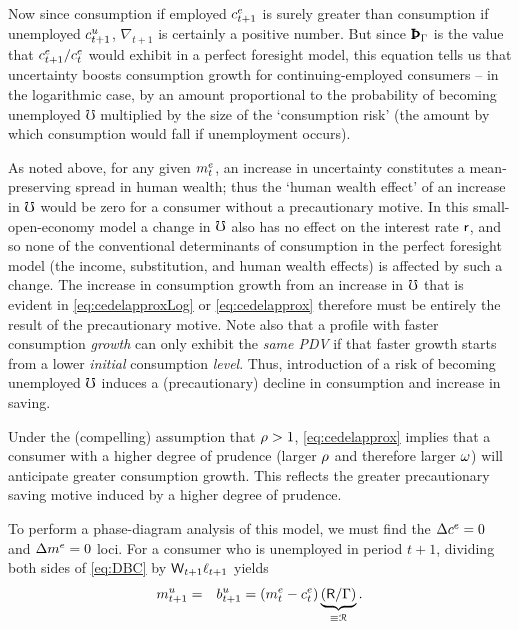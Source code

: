 \documentclass{handout}
\begin{document}
Now since consumption if employed $c^{e}_{t+1}$ is surely greater than
consumption if unemployed $c^{u}_{t+1}$, $\nabla _{t+1}$ is
certainly a positive number.  But since ${\PatPGro}$ is the
value that $c^{e}_{t+1}/c^{e}_{t}$ would exhibit in a perfect
foresight model, this equation tells us that uncertainty boosts
consumption growth for continuing-employed consumers -- in the logarithmic
case, by an amount
proportional to the probability of becoming unemployed $\mho$ multiplied
by the size of the `consumption risk' (the amount by which consumption
would fall if unemployment occurs).


As noted above, for any given $m^{e}_{t}$, an increase in uncertainty
constitutes a mean-preserving spread in human wealth; thus the `human
wealth effect' of an increase in $\mho$ would be zero for a consumer
without a precautionary motive.  In this small-open-economy model a
change in $\mho$ also has no effect on the interest rate $\mathsf{r}$,
and so none of the conventional determinants of consumption in the
perfect foresight model (the income, substitution, and human wealth
effects) is affected by such a change.  The increase in consumption
growth from an increase in $\mho$ that is evident in
\eqref{eq:cedelapproxLog} or \eqref{eq:cedelapprox} therefore must be
entirely the result of the precautionary motive.  Note also that
a profile with faster consumption {\it growth} can only exhibit the {\it same PDV} if that faster growth 
starts from a lower {\it initial} consumption {\it level}.  Thus, introduction of a risk
of becoming unemployed $\mho$ induces a (precautionary) decline in consumption and increase in
saving.

Under the (compelling) assumption that $\rho > 1$, \eqref{eq:cedelapprox} implies that a consumer with
a higher degree of prudence (larger $\rho$ and therefore larger $\omega$) will
anticipate greater consumption growth.  This reflects the greater precautionary
saving motive induced by a higher degree of prudence.


To perform a phase-diagram analysis of this model, we must find
the $\Delta c^{e}=0$ and $\Delta m^{e}=0$ loci.  For a consumer who is unemployed in period $t+1$, dividing both sides of \eqref{eq:DBC} by $\mathsf{W}_{t+1} \ell_{t+1}$ yields
\begin{eqnarray}
  {m}^{u}_{t+1} & = & {b}^{u}_{t+1} = (m^{e}_{t}-c^{e}_{t})\underbrace{(\mathsf{R}/\Gamma)}_{\equiv \mathcal{R}}
.
\end{eqnarray}
\end{document}
